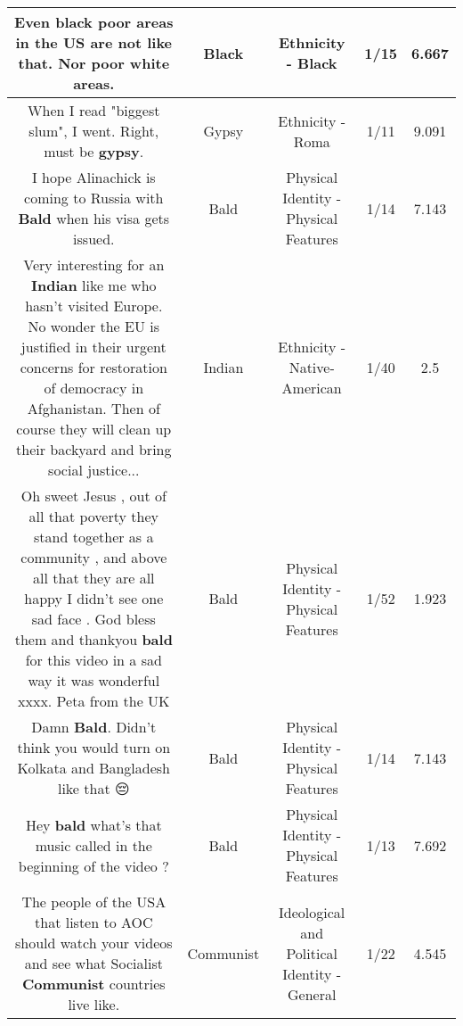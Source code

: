 \documentclass[11pt]{article}
\newlength\mylength
\begin{document}
\begin{center}
\begin{longtable}{|C{.65\mylength}|C{.30\mylength}|C{.12\mylength}|C{.12\mylength}|C{.12\mylength}|}
  \small Even \textbf{black} poor areas in the US are not like that. Nor poor white areas.\normalsize   & Black & Ethnicity - Black & 1/15 & 6.667 \\  \hline
  \small When I read "biggest slum", I went. Right, must be \textbf{gypsy}.\normalsize   & Gypsy & Ethnicity - Roma & 1/11 & 9.091 \\  \hline
  \small I hope Alinachick is coming to Russia with \textbf{Bald} when his visa gets issued.\normalsize   & Bald & Physical Identity - Physical Features & 1/14 & 7.143 \\  \hline
  \small Very interesting for an \textbf{Indian} like me who hasn't visited Europe. No wonder the EU is justified in their urgent concerns for restoration of democracy in Afghanistan. Then of course they will clean up their backyard and bring social justice...\normalsize   & Indian & Ethnicity - Native-American & 1/40 & 2.5 \\  \hline
  \small Oh sweet Jesus , out of all that poverty they stand together as a community , and above all that they are all happy I didn't see one sad face . God bless them and thankyou \textbf{bald} for this video in a sad way it was wonderful xxxx. Peta from the UK\normalsize   & Bald & Physical Identity - Physical Features & 1/52 & 1.923 \\  \hline
  \small Damn \textbf{Bald}. Didn't think you would turn on Kolkata and Bangladesh like that 😔\normalsize   & Bald & Physical Identity - Physical Features & 1/14 & 7.143 \\  \hline
  \small Hey \textbf{bald} what's that music called in the beginning of the video ?\normalsize   & Bald & Physical Identity - Physical Features & 1/13 & 7.692 \\  \hline
  \small The people of the USA that listen to AOC should watch your videos and see what Socialist  \textbf{Communist} countries live like.\normalsize   & Communist &  Ideological and Political Identity - General & 1/22 & 4.545 \\  \hline

\end{longtable}
\end{center}
\end{document}
